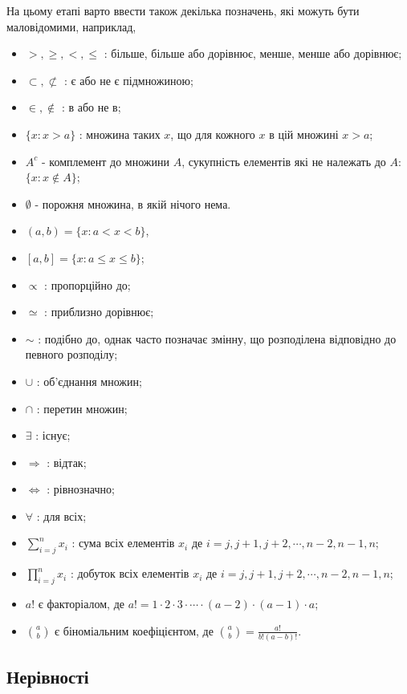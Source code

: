 \documentclass[
  11pt,
]{book}
\providecommand{\tightlist}{%
  \setlength{\itemsep}{0pt}\setlength{\parskip}{0pt}}
\begin{document}
На цьому етапі варто ввести також декілька позначень, які можуть бути
маловідомими, наприклад,

\begin{itemize}
\tightlist
\item
  \(>, \geq, <, \leq\) : більше, більше або дорівнює, менше, менше або
  дорівнює;
\item
  \(\subset, \not\subset\) : є або не є підмножиною;
\item
  \(\in, \notin\) : в або не в;
\item
  \(\{x : x > a\}\) : множина таких \(x\), що для кожного \(x\) в цій
  множині \(x>a\);
\item
  \(A^c\) - комплемент до множини \(A\), сукупність елементів які не
  належать до \(A\): \(\{x: x \notin A\}\);
\item
  \(\emptyset\) - порожня множина, в якій нічого нема.
\item
  \((a, b) = \{x:a<x<b\}\),
\item
  \([a, b] = \{x:a \leq x \leq b\}\);
\item
  \(\propto\) : пропорційно до;
\item
  \(\simeq\) : приблизно дорівнює;
\item
  \(\sim\) : подібно до, однак часто позначає змінну, що розподілена
  відповідно до певного розподілу;
\item
  \(\cup\) : об'єднання множин;
\item
  \(\cap\) : перетин множин;
\item
  \(\exists\) : існує;
\item
  \(\Rightarrow\) : відтак;
\item
  \(\iff\) : рівнозначно;
\item
  \(\forall\) : для всіх;
\item
  \(\sum\limits_{i=j}^{n}x_i\) : сума всіх елементів \(x_i\) де
  \(i = j, j+1, j+2, \cdots, n-2, n-1, n\);
\item
  \(\prod\limits_{i=j}^{n}x_i\) : добуток всіх елементів \(x_i\) де
  \(i = j, j+1, j+2, \cdots, n-2, n-1, n\);
\item
  \(a!\) є факторіалом, де
  \(a! = 1 \cdot 2 \cdot 3 \cdot \cdots \cdot (a-2) \cdot (a-1) \cdot a\);
\item
  \(\binom{a}{b}\) є біноміальним коефіцієнтом, де
  \(\binom{a}{b} = \frac{a!}{b!(a-b)!}\).
\end{itemize}

\subsection{Нерівності}\label{ux43dux435ux440ux456ux432ux43dux43eux441ux442ux456}
\end{document}
